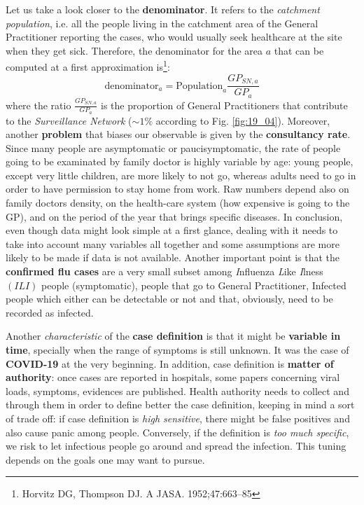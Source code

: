\documentclass[../main/main.tex]{subfiles}
\begin{document}
Let us take a look closer to the \textbf{denominator}. It refers to the \textit{catchment population}, i.e. all the people living
in the catchment area of the General Practitioner reporting the cases, who would usually seek healthcare at the site when they get sick. Therefore, the denominator for the area \( a \) that can be computed at a first approximation is\footnote{Horvitz DG, Thompson DJ. A JASA. 1952;47:663–85}:
\begin{equation*}
    \text{denominator}_a = \text{Population}_a \frac{GP_{SN,a}}{GP_a}
\end{equation*}
where the ratio $\frac{GP_{SN,a}}{GP_a}$ is the proportion of General Practitioners that contribute to the \textit{Surveillance Network} ($\sim1\%$ according to Fig. \ref{fig:19_04}). Moreover, another \textbf{problem} that biases our observable is given by the \textbf{consultancy rate}. Since many people are asymptomatic or paucisymptomatic, the rate of people going to be examinated by family doctor is highly variable by age: young people, except very little children, are more likely to not go, whereas adults need to go in order to have permission to stay home from work. Raw numbers depend also on family doctors density, on the health-care system (how expensive is going to the GP), and on the period of the year that brings specific diseases. In conclusion, even though data might look simple at a first glance, dealing with it needs to take into account many variables all together and some assumptions are more likely to be made if data is not available. Another important point is that the \textbf{confirmed flu cases} are a very small subset among \textit{I}nfluenza \textit{L}ike \textit{I}lness $(ILI)$ people (symptomatic), people that go to General Practitioner, Infected people which either can be detectable or not and that, obviously, need to be recorded as infected.

Another \textit{characteristic} of the \textbf{case definition} is that it might be \textbf{variable in time}, specially when the range of symptoms is still unknown. It was the case of \textbf{COVID-19} at the very beginning. In addition, case definition is \textbf{matter of authority}: once cases are reported in hospitals, some papers concerning viral loads, symptoms, evidences are published. Health authority needs to collect and through them in order to define better the case definition, keeping in mind a sort of trade off: if case definition is \textit{high sensitive}, there might be false positives and also cause panic among people. Conversely, if the definition is \textit{too much specific}, we risk to let infectious people go around and spread the infection. This tuning depends on the goals one may want to pursue.
\end{document}
